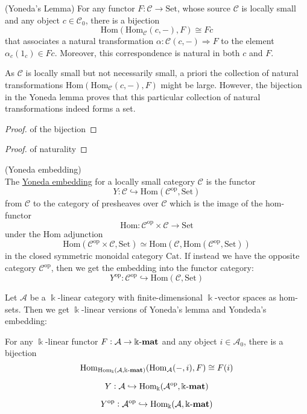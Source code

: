 \begin{lemma}{(Yoneda's Lemma)}
For any functor $F : \mathcal{C} \rightarrow \mathrm{Set}$, whose source $\mathcal{C}$ is locally small and any
object $c \in \mathcal{C}_{0}$, there is a bijection
\[
\mathrm{Hom}(\mathrm{Hom}_{\mathcal{C}}(c,-), F) \cong Fc
\]
that associates a natural transformation $\alpha : \mathcal{C}(c,-) \Rightarrow F$ to the element $\alpha_{c}(1_{c}) \in Fc$.
Moreover, this correspondence is natural in both $c$ and $F$.
\end{lemma}
As $\mathcal{C}$ is locally small but not necessarily small, a priori the collection of natural transformations
$\mathrm{Hom}(\mathrm{Hom}_{\mathcal{C}}(c,-),F)$ might be large. However, the bijection in the Yoneda lemma proves that this particular
collection of natural transformations indeed forms a set.
\begin{proof}{of the bijection}

\end{proof}
\begin{proof}{of naturality}

\end{proof}

\begin{definition}{(Yoneda embedding)}\label{def:yoneda_embedding}\\
The \ul{Yoneda embedding} for a locally small category $\mathcal{C}$ is the functor
\[
Y : \mathcal{C} \hookrightarrow \mathrm{Hom}(\mathcal{C}^{\text{op}}, \mathrm{Set})
\]
from $\mathcal{C}$ to the category of presheaves over $\mathcal{C}$ which is the image of the hom-functor
\[
\mathrm{Hom} : \mathcal{C}^{\text{op}}\times\mathcal{C} \rightarrow \mathrm{Set}
\]
under the $\mathrm{Hom}$ adjunction
\[
\mathrm{Hom}(\mathcal{C}^{\text{op}}\times\mathcal{C}, \mathrm{Set}) \simeq
\mathrm{Hom}(\mathcal{C},\mathrm{Hom}(\mathcal{C}^{\text{op}}, \mathrm{Set}))
\]
in the closed symmetric monoidal category $\mathrm{Cat}$.
If instead we have the opposite category $\mathcal{C}^{\text{op}}$, then we get the embedding into the functor category:
\[
Y^{\text{op}} : \mathcal{C}^{\text{op}} \hookrightarrow \mathrm{Hom}(\mathcal{C},\mathrm{Set})
\]
\end{definition}

\begin{remark}
Let $\mathcal{A}$ be a $\Bbbk$-linear category with finite-dimensional $\Bbbk$-vector spaces as hom-sets. Then we get
$\Bbbk$-linear versions of Yoneda's lemma and Yondeda's embedding:

For any $\Bbbk$-linear functor $F : \mathcal{A} \rightarrow \Bbbk\textnormal{-}\mathbf{mat}$ and any object $i \in \mathcal{A}_{0}$, there is a bijection
\[
\mathrm{Hom}_{\mathrm{Hom_{\Bbbk}}(\mathcal{A},\Bbbk\textnormal{-}\mathbf{mat})}(\mathrm{Hom}_{\mathcal{A}}(-,i), F) \cong F(i)
\]

\[
Y : \mathcal{A} \hookrightarrow \mathrm{Hom_{\Bbbk}}(\mathcal{A^{\text{op}}},\Bbbk\textnormal{-}\mathbf{mat})
\]

\[
Y^{\text{op}} : \mathcal{A}^{\text{op}} \hookrightarrow \mathrm{Hom_{\Bbbk}}(\mathcal{A},\Bbbk\textnormal{-}\mathbf{mat})
\]

\end{remark}

